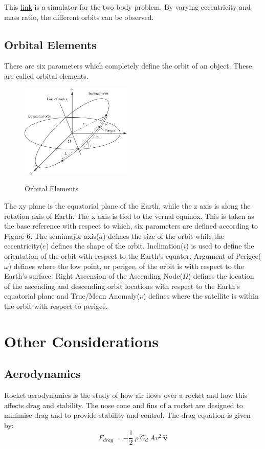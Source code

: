 \documentclass[12pt, letterpaper]{article}
\begin{document}
This \href{https://evgenii.com/blog/two-body-problem-simulator/}{link} is a simulator for the two body problem. By varying eccentricity and mass ratio, the different orbits can be observed.

\subsection{Orbital Elements}
There are six parameters which completely define the orbit of an object. These are called orbital elements.

\begin{figure}[ht]
	\centering
    \includegraphics[width = 200px]{orbital_elements}
    \label{fig:elements}
    \caption{Orbital Elements}
\end{figure}
The xy plane is the equatorial plane of the Earth, while the z axis is along the rotation axis of Earth. The x axis is tied to the vernal equinox. This is taken as the base reference with respect to which, six parameters are defined according to Figure 6. The semimajor axis($a$) defines the size of the orbit while the eccentricity($e$) defines the shape of the orbit. Inclination($i$) is used to define the orientation of the orbit with respect to the Earth's equator. Argument of Perigee($\omega$) defines where the low point, or perigee, of the orbit is with respect to the Earth's surface. Right Ascension of the Ascending Node($\Omega$) defines the location of the ascending and descending orbit locations with respect to the Earth's equatorial plane and True/Mean Anomaly($\nu$) defines where the satellite is within the orbit with respect to perigee.

\newpage
\section{Other Considerations}
\subsection{Aerodynamics}
Rocket aerodynamics is the study of how air flows over a rocket and how this affects drag and stability. The nose cone and fins of a rocket are designed to minimise drag and to provide stability and control. The drag equation is given by:
\[
	F_{drag} = -\frac{1}{2}\: \rho \: C_d \: A v^2 \: \hat{\mathbf{v}}
\]
\end{document}
